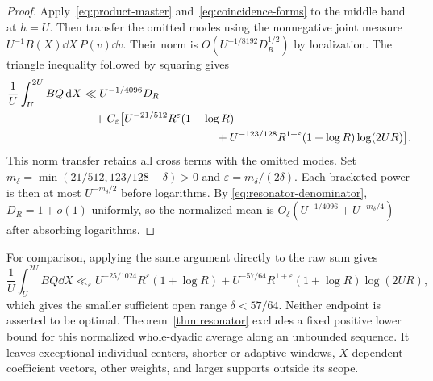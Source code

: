 \begin{proof}
Apply~\eqref{eq:product-master} and~\eqref{eq:coincidence-forms}
to the middle band at $h=U$. Then transfer the omitted modes using
the nonnegative joint measure $U^{-1}B(X)\dd X\,P(v)\dd v$.
Their norm is $O(U^{-1/8192}D_R^{1/2})$ by localization.
The triangle inequality followed by squaring gives
\begin{equation}\label{eq:resonator-full}
 \begin{split}
 \frac1U\int_U^{2U}BQ\dd X
 &\ll U^{-1/4096}D_R\\
 &\quad+C_\varepsilon\bigl[
 U^{-21/512}R^\varepsilon(1+\log R)\\
 &\hspace{42mm}+U^{-123/128}R^{1+\varepsilon}
                   (1+\log R)\log(2UR)\bigr].
 \end{split}
\end{equation}
This norm transfer retains all cross terms with the omitted modes.
Set $m_\delta=\min(21/512,123/128-\delta)>0$ and
$\varepsilon=m_\delta/(2\delta)$. Each bracketed power is then
at most $U^{-m_\delta/2}$ before logarithms. By
\eqref{eq:resonator-denominator}, $D_R=1+o(1)$ uniformly, so
the normalized mean is
$O_\delta(U^{-1/4096}+U^{-m_\delta/4})$ after absorbing logarithms.
\end{proof}

For comparison, applying the same argument directly to the raw sum
gives
\[
 \frac1U\int_U^{2U}BQ\dd X
 \ll_\varepsilon U^{-25/1024}R^\varepsilon(1+\log R)
 +U^{-57/64}R^{1+\varepsilon}(1+\log R)\log(2UR),
\]
which gives the smaller sufficient open range $\delta<57/64$.
Neither endpoint is asserted to be optimal.
Theorem~\ref{thm:resonator} excludes a fixed positive lower bound
for this normalized whole-dyadic average along an unbounded sequence.
It leaves exceptional individual centers, shorter or adaptive windows,
$X$-dependent coefficient vectors, other weights, and larger supports
outside its scope.
